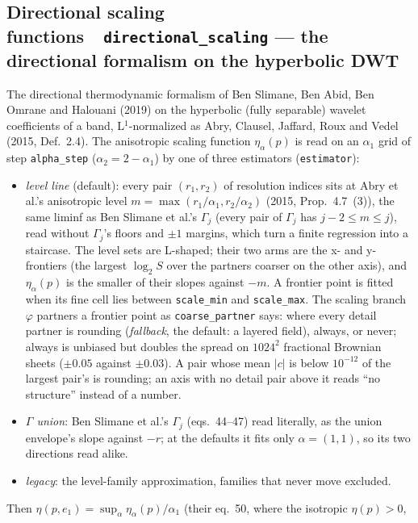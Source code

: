 \documentclass[10pt]{article}
\newcommand{\dev}[1]{\texttt{#1}}
\newcommand{\tool}[2]{#1~\textperiodcentered~\dev{#2}}
\begin{document}
\subsection{\tool{Directional scaling functions}{directional\_scaling} --- the directional formalism on the hyperbolic DWT}\label{sec:directional}
The directional thermodynamic formalism of Ben Slimane, Ben Abid, Ben Omrane and Halouani (2019) on the
hyperbolic (fully separable) wavelet coefficients of a band, L$^1$-normalized as Abry, Clausel, Jaffard,
Roux and Vedel (2015, Def.~2.4). The anisotropic scaling function $\eta_\alpha(p)$ is read on an $\alpha_1$
grid of step \texttt{alpha\_step} ($\alpha_2 = 2 - \alpha_1$) by one of three estimators (\texttt{estimator}):
\begin{itemize}\itemsep1pt
  \item \emph{level line} (default): every pair $(r_1, r_2)$ of resolution indices sits at Abry et al.'s
        anisotropic level $m = \max(r_1/\alpha_1, r_2/\alpha_2)$ (2015, Prop.~4.7~(3)), the same liminf as
        Ben Slimane et al.'s $\Gamma_j$ (every pair of $\Gamma_j$ has $j-2 \le m \le j$), read without
        $\Gamma_j$'s floors and $\pm1$ margins, which turn a finite regression into a staircase. The level
        sets are L-shaped; their two arms are the x- and y-frontiers (the largest $\log_2 S$ over the
        partners coarser on the other axis), and $\eta_\alpha(p)$ is the smaller of their slopes against
        $-m$. A frontier point is fitted when its fine cell lies between \texttt{scale\_min} and
        \texttt{scale\_max}. The scaling branch $\varphi$ partners a frontier point as
        \texttt{coarse\_partner} says: where every detail partner is rounding (\emph{fallback}, the
        default: a layered field), always, or never; always is unbiased but doubles the spread on
        $1024^2$ fractional Brownian sheets ($\pm0.05$ against $\pm0.03$). A pair whose mean $|c|$ is below
        $10^{-12}$ of the largest pair's is rounding; an axis with no detail pair above it reads ``no
        structure'' instead of a number.
  \item \emph{$\Gamma$ union}: Ben Slimane et al.'s $\Gamma_j$ (eqs.~44--47) read literally, as the
        union envelope's slope against $-r$; at the defaults it fits only $\alpha = (1, 1)$, so its
        two directions read alike.
  \item \emph{legacy}: the level-family approximation, families that never move excluded.
\end{itemize}
Then $\eta(p, e_1) = \sup_\alpha \eta_\alpha(p)/\alpha_1$ (their eq.~50, where the isotropic $\eta(p) > 0$,
\end{document}
